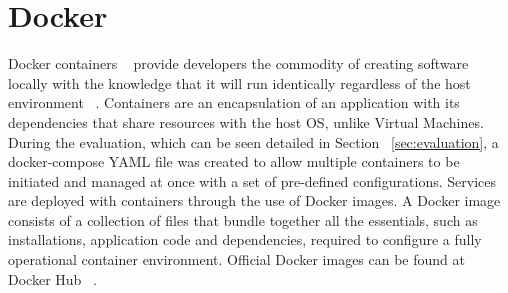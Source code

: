 \section{Docker}
Docker containers ~\cite{docker_containers} provide developers the commodity of creating software locally with the knowledge that it will run identically regardless of the host environment ~\cite{using_docker_book}. Containers are an encapsulation of an application with its dependencies that share resources with the host OS, unlike Virtual Machines. During the evaluation, which can be seen detailed in Section ~\ref{sec:evaluation}, a docker-compose YAML file was created to allow multiple containers to be initiated and managed at once with a set of pre-defined configurations. Services are deployed with containers through the use of Docker images. A Docker image consists of a collection of files that bundle together all the essentials, such as installations, application code and dependencies, required to configure a fully operational container environment. Official Docker images can be found at Docker Hub ~\cite{docker_hub}.